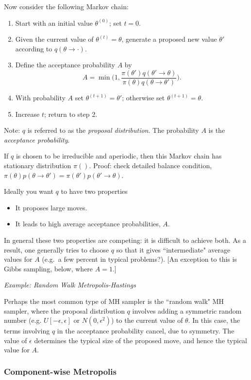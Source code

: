 \documentclass[12pt]{article}
\begin{document}
Now consider the following Markov chain:
\begin{enumerate}
\item Start with an initial value $\theta^{(0)}$; set $t=0$.
\item Given the current value of $\theta^{(t)}=\theta$, generate a proposed new value $\theta'$
according to $q(\theta \rightarrow \cdot)$.
\item Define the acceptance probability $A$ by
$$A = \min \biggl(1, \frac{\pi(\theta') q(\theta' \rightarrow \theta)}{\pi(\theta) q(\theta \rightarrow \theta')} \biggr).$$ 
\item With probability $A$ set $\theta^{(t+1)} = \theta'$; otherwise set $\theta^{(t+1)} = \theta$.
\item Increase $t$; return to step 2.
\end{enumerate}
Note: $q$ is referred to as the {\it proposal distribution}. The probability $A$ is the {\it acceptance
probability}.

If $q$ is chosen to be irreducible and aperiodic, then this Markov chain has stationary distribution $\pi()$. Proof: check detailed balance condition, $\pi(\theta) p(\theta \rightarrow \theta') = \pi(\theta') p(\theta' \rightarrow \theta)$. 

Ideally you want $q$ to have two properties
\begin{itemize}
\item It proposes large moves.
\item It leads to high average acceptance probabilities, $A$.
\end{itemize}

In general these two properties are competing: it is difficult to achieve both. As a result,
one generally tries to choose $q$ so that it gives ``intermediate" average values for $A$ (e.g.~a few
percent in typical problems?). [An exception to this is Gibbs sampling, below, where $A=1$.]

{\it Example: Random Walk Metropolis-Hastings}

Perhaps the most common type of MH sampler is the ``random walk" MH sampler, where the proposal distribution $q$ involves adding a symmetric random number (e.g. $U[-\epsilon,\epsilon]$ or $N(0,\epsilon^2)$) to the current value of $\theta$. In this case, the terms involving $q$ in the acceptance probability cancel,
due to symmetry.  The value of $\epsilon$ determines the typical
size of the proposed move, and hence the typical value for $A$.

\subsubsection{Component-wise Metropolis}
\end{document}
